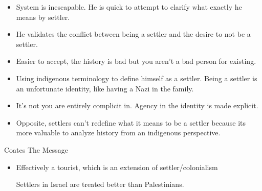 \documentclass{report}
\begin{document}
\begin{description}
\begin{mdframed}
\begin{itemize}
                \item System is inescapable. He is quick to attempt to clarify
                    what exactly he means by settler. 

                \item He validates the conflict between being a settler and
                    the desire to not be a settler. 

                \item Easier to accept, the history is bad but you aren't a bad
                    person for existing.

                \item Using indigenous terminology to define himself as a settler.
                    Being a settler is an unfortunate identity, like having a
                    Nazi in the family.

                \item It's not you are entirely complicit in. Agency in the
                    identity is made explicit.

                \item Opposite, settlers can't redefine what it means to be
                    a settler because its more valuable to analyze
                    history from an indigenous perspective.
            \end{itemize}
        \end{mdframed}

    \item Coates The Message
        \begin{itemize} 
            \item Effectively a tourist, which is an extension of settler/colonialism
                
                Settlers in Israel are treated better than Palestinians.

        \end{itemize} 

\end{description}
\end{document}
